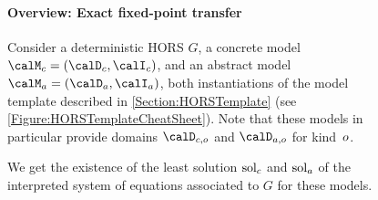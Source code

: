 \documentclass[../../diss.tex]{subfiles}
\begin{document}
\begin{figure}
    \onehalfspacing%
    {%
    \setlength{\fboxsep}{1em}
    \fbox%
    {%
        \begin{minipage}{\textwidth-2.5em}
            \vspace*{0.5em}
            \paragraph{\large Overview: Exact fixed-point transfer}
            \vspace{1em}
            Consider a deterministic HORS $G$, a concrete model $\modelc = (\domainc,\interpretationc)$, and an abstract model $\modela = (\domaina,\interpretationa)$, both instantiations of the model template described in \cref{Section:HORSTemplate} (see \cref{Figure:HORSTemplateCheatSheet}).
            Note that these models in particular provide domains $\domainc{\ground}$ and $\domaina{\ground}$ for kind~$o$.

            We get the existence of the least solution $\solc$ and $\sola$ of the interpreted system of equations associated to $G$ for these models.
            \vspace*{1em}

\end{minipage}}}
\end{figure}
\end{document}
